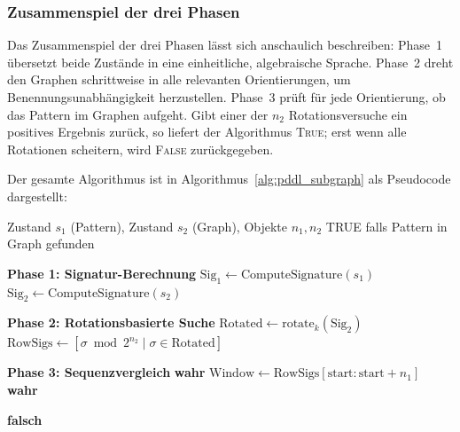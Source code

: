 ﻿\documentclass[a4paper,12pt]{article}
\theoremstyle{definition}
\begin{document}
\subsubsection*{Zusammenspiel der drei Phasen}

Das Zusammenspiel der drei Phasen lässt sich anschaulich beschreiben: Phase~1 übersetzt beide Zustände in eine einheitliche, algebraische Sprache. Phase~2 dreht den Graphen schrittweise in alle relevanten Orientierungen, um Benennungsunabhängigkeit herzustellen. Phase~3 prüft für jede Orientierung, ob das Pattern im Graphen aufgeht. Gibt einer der $n_2$ Rotationsversuche ein positives Ergebnis zurück, so liefert der Algorithmus \textsc{True}; erst wenn alle Rotationen scheitern, wird \textsc{False} zurückgegeben.

Der gesamte Algorithmus ist in Algorithmus~\ref{alg:pddl_subgraph} als Pseudocode dargestellt:

\begin{algorithm}[H]
	\caption{Subgraph-Matching für PDDL-Zustände}
	\label{alg:pddl_subgraph}
	\begin{algorithmic}[1]
		\Eingabe Zustand $s_1$ (Pattern), Zustand $s_2$ (Graph), Objekte $n_1, n_2$
		\Ausgabe TRUE falls Pattern in Graph gefunden
		
		\State \textbf{Phase 1: Signatur-Berechnung}
		\State $\text{Sig}_1 \gets \text{ComputeSignature}(s_1)$ 
		\State $\text{Sig}_2 \gets \text{ComputeSignature}(s_2)$ 
		
		\State \textbf{Phase 2: Rotationsbasierte Suche}
		 
		\State $\text{Rotated} \gets \text{rotate}_k(\text{Sig}_2)$
		\State $\text{RowSigs} \gets [\sigma \bmod 2^{n_2} \mid \sigma \in \text{Rotated}]$ 
		
		\State \textbf{Phase 3: Sequenzvergleich}
		 
		\State \Return \textbf{wahr}
		\EndeWenn
		\Sonst
		 
		\State $\text{Window} \gets \text{RowSigs}[\text{start}:\text{start}+n_1]$
		 
		\State \Return \textbf{wahr}
		\EndeWenn
		\EndeFuer
		\EndeWenn
		\EndeFuer
		
		\State \Return \textbf{falsch}
	\end{algorithmic}
\end{algorithm}
\end{document}
